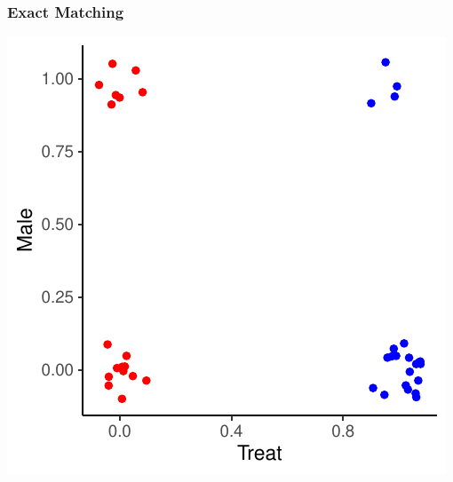 \documentclass[xcolor=x11names,compress]{beamer}\usepackage[]{graphicx}\usepackage[]{color}
\makeatletter
\def\maxwidth{ %
  \ifdim\Gin@nat@width>\linewidth
    \linewidth
  \else
    \Gin@nat@width
  \fi
}
\newenvironment{knitrout}{}{} %
\renewcommand{\(}{\begin{columns}}
\renewcommand{\)}{\end{columns}}
\newcommand{\<}[1]{\begin{column}{#1}}
\renewcommand{\>}{\end{column}}
\makeatother
\begin{document}
\begin{frame}
\frametitle{Exact Matching}
\begin{center}
\begin{knitrout}
\color{fgcolor}
\includegraphics[width=\maxwidth]{figure/exact_matching_1-1} 

\end{knitrout}
\end{center}
\end{frame}
\end{document}
